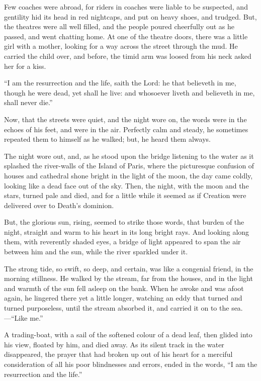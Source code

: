 Few coaches were abroad, for riders in coaches were liable to be
suspected, and gentility hid its head in red nightcaps, and put on
heavy shoes, and trudged.  But, the theatres were all well filled,
and the people poured cheerfully out as he passed, and went chatting
home.  At one of the theatre doors, there was a little girl with a
mother, looking for a way across the street through the mud.
He carried the child over, and before, the timid arm was loosed from
his neck asked her for a kiss.

``I am the resurrection and the life, saith the Lord:  he that
believeth in me, though he were dead, yet shall he live:  and
whosoever liveth and believeth in me, shall never die.''

Now, that the streets were quiet, and the night wore on, the words
were in the echoes of his feet, and were in the air.  Perfectly calm
and steady, he sometimes repeated them to himself as he walked; but,
he heard them always.

The night wore out, and, as he stood upon the bridge listening to the
water as it splashed the river-walls of the Island of Paris, where
the picturesque confusion of houses and cathedral shone bright in the
light of the moon, the day came coldly, looking like a dead face out
of the sky. Then, the night, with the moon and the stars, turned pale
and died, and for a little while it seemed as if Creation were
delivered over to Death's dominion.

But, the glorious sun, rising, seemed to strike those words, that
burden of the night, straight and warm to his heart in its long
bright rays.  And looking along them, with reverently shaded eyes,
a bridge of light appeared to span the air between him and the sun,
while the river sparkled under it.

The strong tide, so swift, so deep, and certain, was like a congenial
friend, in the morning stillness.  He walked by the stream, far from
the houses, and in the light and warmth of the sun fell asleep on the
bank. When he awoke and was afoot again, he lingered there yet a
little longer, watching an eddy that turned and turned purposeless,
until the stream absorbed it, and carried it on to the sea.---``Like me.''

A trading-boat, with a sail of the softened colour of a dead leaf,
then glided into his view, floated by him, and died away.  As its
silent track in the water disappeared, the prayer that had broken up
out of his heart for a merciful consideration of all his poor
blindnesses and errors, ended in the words, ``I am the resurrection
and the life.''

